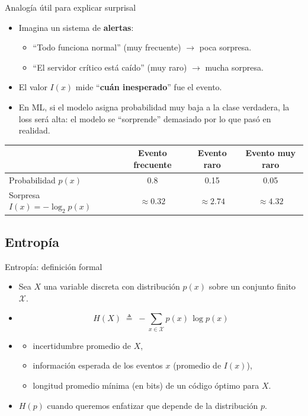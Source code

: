 \begin{frame}{Analogía útil para explicar surprisal}
\begin{itemize}
  \item Imagina un sistema de \textbf{alertas}:
  \begin{itemize}
    \item “Todo funciona normal” (muy frecuente) \(\rightarrow\) poca sorpresa.
    \item “El servidor crítico está caído” (muy raro) \(\rightarrow\) mucha sorpresa.
  \end{itemize}
  \item El valor \(I(x)\) mide “\textbf{cuán inesperado}” fue el evento.
  \item En ML, si el modelo asigna probabilidad muy baja a la clase verdadera, la loss será alta: el modelo se “sorprende” demasiado por lo que pasó en realidad.
\end{itemize}
\vspace{0.8em}
\begin{center}
\small
\begin{tabular}{lccc}
\toprule
 & Evento frecuente & Evento raro & Evento muy raro \\
\midrule
Probabilidad \(p(x)\) & 0.8 & 0.15 & 0.05 \\
Sorpresa \(I(x)=-\log_2 p(x)\) & \(\approx 0.32\) & \(\approx 2.74\) & \(\approx 4.32\) \\
\bottomrule
\end{tabular}
\end{center}
\end{frame}

\subsection{Entropía}

\begin{frame}{Entropía: definición formal}
\begin{itemize}
  \item Sea \(X\) una variable discreta con distribución \(p(x)\) sobre un conjunto finito \(\mathcal{X}\).
  \item {}
  \[
    H(X) \;\triangleq\; -\sum_{x\in\mathcal{X}} p(x)\,\log p(x)
  \]
  \item {}
  \begin{itemize}
    \item incertidumbre promedio de \(X\),
    \item información esperada de los eventos \(x\) (promedio de \(I(x)\)),
    \item longitud promedio mínima (en bits) de un código óptimo para \(X\).
  \end{itemize}
  \item {} \(H(p)\) cuando queremos enfatizar que depende de la distribución \(p\).
\end{itemize}
\end{frame}

